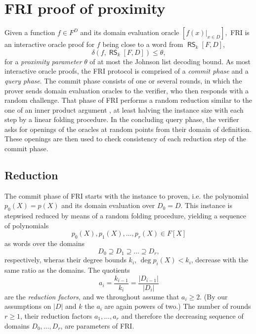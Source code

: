 \documentclass[11pt,article,oneside]{memoir}
\theoremstyle{definition}
\theoremstyle{remark}
\DeclareMathOperator{\RS}{\mathsf{RS}}
\begin{document}
\chapter{FRI proof of proximity}

Given a function $f\in F^D$ and its  domain evaluation oracle 
$
[f(x)|_{x\in D}],
$ 
FRI is an interactive oracle proof for $f$ being close to a word from $\RS_k[F,D]$, 
\[
\delta( f, \RS_k[F,D]) \leq \theta,
\]
for a \textit{proximity parameter} $\theta$ of at most the Johnson list decoding bound. %
%
As most interactive oracle proofs, the FRI protocol is comprised of a \textit{commit phase} and a \textit{query phase}.
The commit phase consists of one or several rounds, in which the prover sends domain evaluation oracles to the verifier, who then responds with a random challenge.
That phase of FRI performs a random reduction similar to the one of an inner product argument \cite{BootleGroth}, at least halving the instance size with each step by a linear folding procedure.
In the concluding query phase, the verifier asks for openings of the oracles at random points from their domain of definition. 
These openings are then used to check consistency of each reduction step of the commit phase.


\section{Reduction}


The commit phase of FRI starts with the instance to proven, i.e. the polynomial $p_0(X)=p(X)$ and its domain evaluation over $D_0=D$.
This instance is stepwised reduced by means of a random folding procedure, yielding a sequence of polynomials 
\[
p_0(X), p_1(X), \ldots , p_r(X)\in  F[X]
\]
as words over the domains 
\[
D_0\supseteq D_1\supseteq \ldots\supseteq D_r,
\]
respectively, wheras their degree bounds $k_i$, $\deg p_i(X) < k_i$, decrease with the same ratio as the domains.
The quotients 
\[
a_i = \frac{k_{i-1}}{k_i} = \frac{|D_{i-1}|}{|D_i|} 
\]
are the \textit{reduction factors}, and we throughout assume that $a_i\geq 2$. (By our assumptions on $|D|$ and $k$ the $a_i$ are again powers of two.)
The number of rounds $r\geq 1$,  their reduction factors $a_1,\ldots, a_r$ and therefore the decreasing sequence of domains $D_0,\ldots, D_r$, are parameters of FRI.
\end{document}
